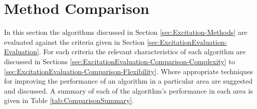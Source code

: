\section{Method Comparison}
\label{sec:ExcitationEvaluation-Comparison}
	In this section the algorithms discussed in Section \ref{sec:Excitation-Methods} are evaluated against the criteria
	given in Section \ref{sec:ExcitationEvaluation-Evaluation}. For each criteria the relevant characteristics of each
	algorithm are discussed in Sections \ref{sec:ExcitationEvaluation-Comparison-Complexity} to
	\ref{sec:ExcitationEvaluation-Comparison-Flexibility}. Where appropriate techniques for improving the performance
	of an algorithm in a particular area are suggested and discussed. A summary of each of the algorithm's performance
	in each area is given in Table \ref{tab:ComparisonSummary}.

